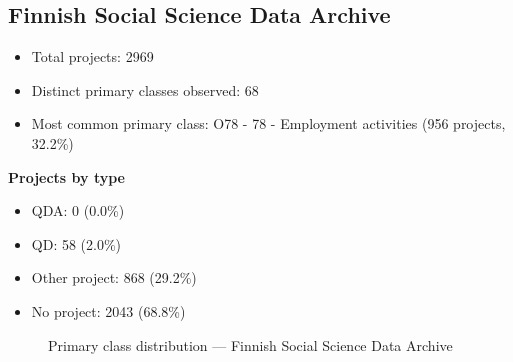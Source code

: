 \subsection{Finnish Social Science Data Archive}

\begin{itemize}
    \item Total projects: 2969
    \item Distinct primary classes observed: 68
    \item Most common primary class: O78 - 78 - Employment activities (956 projects, 32.2\%)
\end{itemize}
\textbf{Projects by type}
\begin{itemize}
    \item QDA: 0 (0.0\%)
    \item QD: 58 (2.0\%)
    \item Other project: 868 (29.2\%)
    \item No project: 2043 (68.8\%)
\end{itemize}

\begin{figure}[H]
    \centering
    
    \caption{Primary class distribution --- Finnish Social Science Data Archive}
\end{figure}

